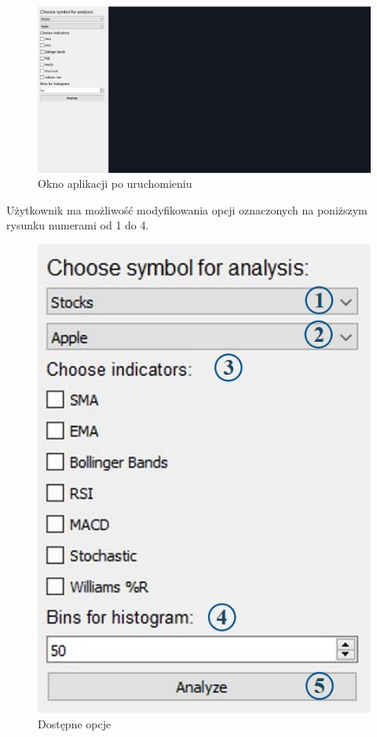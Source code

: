 \documentclass[12pt]{article}
\begin{document}
	\begin{figure}[H]
		\centering
		\includegraphics[scale=0.4]{pics/po_odpaleniu.jpg}
		\caption{Okno aplikacji po uruchomieniu} 
	\end{figure}
	
	Użytkownik ma możliwość modyfikowania opcji oznaczonych na poniższym rysunku numerami od 1 do 4.
	
	\begin{figure}[H]
		\centering
		\includegraphics[scale=0.4]{pics/opcje.jpg}
		\caption{Dostępne opcje} 
	\end{figure}
	
\end{document}
